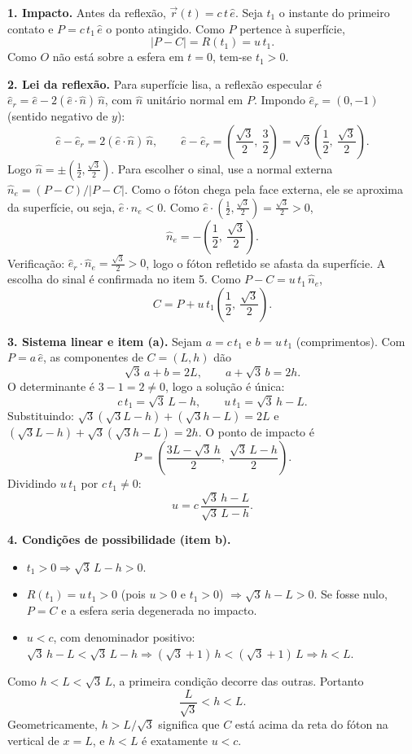 \documentclass{article}%
\begin{document}
\textbf{1. Impacto.} Antes da reflexão, $\vec r(t)=c\,t\,\hat e$. Seja $t_1$ o instante do primeiro contato e $P=c\,t_1\,\hat e$ o ponto atingido. Como $P$ pertence à superfície,
\[
|P-C|=R(t_1)=u\,t_1.
\]
Como $O$ não está sobre a esfera em $t=0$, tem-se $t_1>0$.

\textbf{2. Lei da reflexão.} Para superfície lisa, a reflexão especular é $\hat e_r=\hat e-2(\hat e\cdot\hat n)\,\hat n$, com $\hat n$ unitário normal em $P$. Impondo $\hat e_r=(0,-1)$ (sentido negativo de $y$):
\[
\hat e-\hat e_r=2(\hat e\cdot\hat n)\,\hat n,\qquad \hat e-\hat e_r=\left(\frac{\sqrt3}{2},\ \frac32\right)=\sqrt3\left(\frac12,\ \frac{\sqrt3}{2}\right).
\]
Logo $\hat n=\pm\left(\tfrac12,\tfrac{\sqrt3}{2}\right)$. Para escolher o sinal, use a normal externa $\hat n_e=(P-C)/|P-C|$. Como o fóton chega pela face externa, ele se aproxima da superfície, ou seja, $\hat e\cdot\hat n_e<0$. Como $\hat e\cdot\left(\tfrac12,\tfrac{\sqrt3}{2}\right)=\tfrac{\sqrt3}{2}>0$,
\[
\hat n_e=-\left(\frac12,\ \frac{\sqrt3}{2}\right).
\]
Verificação: $\hat e_r\cdot\hat n_e=\tfrac{\sqrt3}{2}>0$, logo o fóton refletido se afasta da superfície. A escolha do sinal é confirmada no item 5. Como $P-C=u\,t_1\,\hat n_e$,
\[
C=P+u\,t_1\left(\frac12,\ \frac{\sqrt3}{2}\right).
\]

\textbf{3. Sistema linear e item (a).} Sejam $a=c\,t_1$ e $b=u\,t_1$ (comprimentos). Com $P=a\,\hat e$, as componentes de $C=(L,h)$ dão
\[
\sqrt3\,a+b=2L,\qquad a+\sqrt3\,b=2h.
\]
O determinante é $3-1=2\neq0$, logo a solução é única:
\[
c\,t_1=\sqrt3\,L-h,\qquad u\,t_1=\sqrt3\,h-L.
\]
Substituindo: $\sqrt3(\sqrt3L-h)+(\sqrt3h-L)=2L$ e $(\sqrt3L-h)+\sqrt3(\sqrt3h-L)=2h$. O ponto de impacto é
\[
P=\left(\frac{3L-\sqrt3\,h}{2},\ \frac{\sqrt3\,L-h}{2}\right).
\]
Dividindo $u\,t_1$ por $c\,t_1\neq0$:
\[
u=c\,\frac{\sqrt3\,h-L}{\sqrt3\,L-h}.
\]

\textbf{4. Condições de possibilidade (item b).}
\begin{itemize}
\item $t_1>0\Rightarrow \sqrt3\,L-h>0$.
\item $R(t_1)=u\,t_1>0$ (pois $u>0$ e $t_1>0$) $\Rightarrow \sqrt3\,h-L>0$. Se fosse nulo, $P=C$ e a esfera seria degenerada no impacto.
\item $u<c$, com denominador positivo: $\sqrt3\,h-L<\sqrt3\,L-h\Rightarrow(\sqrt3+1)\,h<(\sqrt3+1)\,L\Rightarrow h<L$.
\end{itemize}
Como $h<L<\sqrt3\,L$, a primeira condição decorre das outras. Portanto
\[
\frac{L}{\sqrt3}<h<L.
\]
Geometricamente, $h>L/\sqrt3$ significa que $C$ está acima da reta do fóton na vertical de $x=L$, e $h<L$ é exatamente $u<c$.
\end{document}
